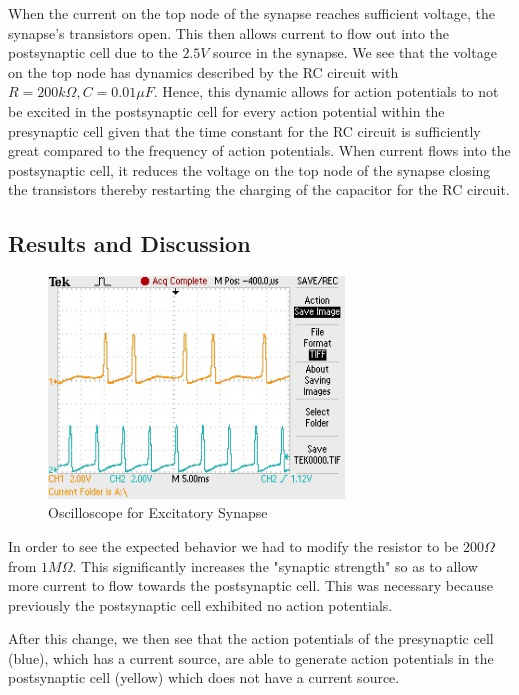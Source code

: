\documentclass[12]{book}
\newcommand\0{\mathbf{0}}
\newcommand\<{\langle}
\renewcommand\>{\rangle}
\begin{document}
When the current on the top node of the synapse reaches sufficient voltage, the synapse's transistors open. This then allows current to flow out into the postsynaptic cell due to the $2.5V$ source in the synapse. We see that the voltage on the top node has dynamics described by the RC circuit with $R=200 k \Omega, C = 0.01 \mu F$. Hence, this dynamic allows for action potentials to not be excited in the postsynaptic cell for every action potential within the presynaptic cell given that the time constant for the RC circuit is sufficiently great compared to the frequency of action potentials. When current flows into the postsynaptic cell, it reduces the voltage on the top node of the synapse closing the transistors thereby restarting the charging of the capacitor for the RC circuit.

\subsection{Results and Discussion}

\begin{figure}[H]
\centering
\includegraphics[width=0.7\textwidth]{excitatory.jpg}
\caption{Oscilloscope for Excitatory Synapse}
\end{figure}

In order to see the expected behavior we had to modify the resistor to be $200 \Omega$ from $1 M \Omega$. This significantly increases the "synaptic strength" so as to allow more current to flow towards the postsynaptic cell. This was necessary because previously the postsynaptic cell exhibited no action potentials.

After this change, we then see that the action potentials of the presynaptic cell (blue), which has a current source, are able to generate action potentials in the postsynaptic cell (yellow) which does not have a current source.  
\end{document}
